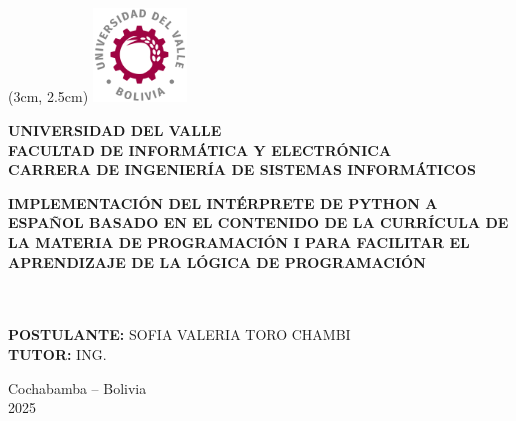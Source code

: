 \documentclass[a4paper]{article}
\begin{document}
\begin{center}
    \vspace*{1cm}
    \begin{textblock*}{2.5cm}(3cm, 2.5cm) %
        \includegraphics[width=2.5cm]{images/univalle.png}
    \end{textblock*}

    \textbf{\LARGE UNIVERSIDAD DEL VALLE}\\[0.3cm]
    \textbf{\large FACULTAD DE INFORMÁTICA Y ELECTRÓNICA}\\[0.2cm]
    \textbf{\large CARRERA DE INGENIERÍA DE SISTEMAS INFORMÁTICOS}\\[1.5cm]

    \begin{minipage}{0.9\textwidth}
        \centering
        \textbf{\large IMPLEMENTACIÓN DEL INTÉRPRETE DE PYTHON A ESPAÑOL BASADO EN EL CONTENIDO DE LA CURRÍCULA DE LA MATERIA DE PROGRAMACIÓN I PARA FACILITAR EL APRENDIZAJE DE LA LÓGICA DE PROGRAMACIÓN}
    \end{minipage}\\[1.5cm]


    \noindent{}\\[1.5cm]

    \textbf{POSTULANTE:} SOFIA VALERIA TORO CHAMBI\\[0.15cm]
    \textbf{TUTOR:} ING. \\[2cm]

    \begin{minipage}{0.6\textwidth}
        \centering
        Cochabamba – Bolivia\\
        2025
    \end{minipage}\\[0.8cm]

\end{center}
\end{document}
